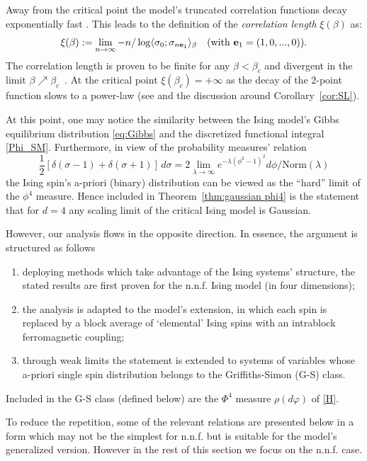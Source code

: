 \documentclass[a4paper,oneside,11pt]{article}
\newcommand{\be}[1]{\begin{equation}\label{#1}}
\newcommand{\ee}{\end{equation}}
\numberwithin{equation}{section}
\numberwithin{equation}{section}
\numberwithin{equation}{section}
\def\be{\begin{equation}}
\def\ee{\end{equation}}
\begin{document}
Away from the critical point the model's truncated correlation functions  
decay exponentially fast \cite{AizBarFer87,DumGosRao18}.  This leads to the definition of the {\em correlation length} $\xi(\beta)$ as:
\be 
\xi(\beta):=\lim_{n\rightarrow\infty}-n/\log \langle\sigma_0;\sigma_{n{\bf e}_1}\rangle_{\beta}\quad \mbox{(with ${\bf e}_1 = (1,0,...,0)$)}. 
\ee
The correlation length is proven to be finite for any $\beta < \beta_c$ \cite{AizBarFer87} and divergent in the limit $\beta \nearrow \beta_c$~\cite{Sim80}.    At the critical point $\xi(\beta_c)=+\infty$ 
 as  the decay of the 2-point function slows to a power-law (see \cite{Sim80} and  the  discussion around Corollary~\ref{cor:SL}).   
 
At this point, one may notice the similarity between the Ising model's Gibbs equilibrium distribution \eqref{eq:Gibbs} and  the discretized functional integral \eqref{Phi_SM}.  Furthermore,  in view of the probability measures' relation
\be \label{Phi4_Ising}
 \frac{1}{2} [\delta(\sigma-1) + \delta(\sigma+1)] \, d\sigma  = 2 \lim_{\lambda\to \infty} e^{-\lambda (\phi^2-1)^2} d \phi / \text{Norm}(\lambda)
 \ee   
 the Ising spin's a-priori (binary) distribution can be viewed as the ``hard''  limit of the $\phi^4$ measure. 
Hence included in Theorem~\ref{thm:gaussian phi4} is the statement that for $d=4$ any scaling limit of the critical Ising model is Gaussian.  

 However, our analysis flows in the opposite direction.  In essence, the argument is structured as follows
 \begin{enumerate} 
 \item   deploying methods which take advantage of the Ising systems' structure,  the stated results are first  proven for the n.n.f. Ising model (in four dimensions);
 \item the analysis is  adapted to the model's extension, in which each spin is  replaced by a block average of `elemental' Ising spins with an intrablock ferromagnetic coupling;
 \item through  weak limits the statement is extended to systems of variables whose a-priori single spin distribution belongs to the Griffiths-Simon (G-S) class.   \end{enumerate} 
Included in the G-S  class (defined below) are the $\Phi^4$ measure 
$\rho(d \varphi) $ of \eqref{H}.
\medbreak

To reduce the repetition,  some of the relevant relations are presented below in a form which may not be the simplest for n.n.f. but is suitable  for the model's  generalized version.   However  in the rest of this section we focus on the n.n.f. case. 
\end{document}
